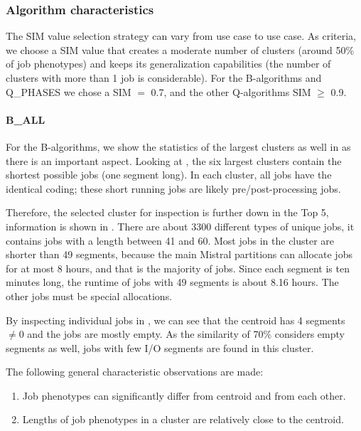 \documentclass{jhps}
\begin{document}
\subsubsection{Algorithm characteristics}
The SIM value selection strategy can vary from use case to use case.
As criteria, we choose a SIM value that creates a moderate number of clusters (around 50\% of job phenotypes) and keeps its generalization capabilities (the number of clusters with more than 1 job is considerable).
For the B-algorithms and Q\_PHASES we chose a SIM $=$ 0.7, and the other Q-algorithms SIM $\geq$ 0.9.

\FloatBarrier
\paragraph{B\_ALL}
For the B-algorithms, we show the statistics of the largest clusters as well in  as there is an important aspect.
Looking at , the six largest clusters contain the shortest possible jobs (one segment long).
In each cluster, all jobs have the identical coding; these short running jobs are likely pre/post-processing jobs.

Therefore, the selected cluster for inspection is further down in the Top 5, information is shown in .
There are about 3300 different types of unique jobs, it contains jobs with a length between 41 and 60.
Most jobs in the cluster are shorter than 49 segments, because the main Mistral partitions can allocate jobs for at most 8 hours, and that is the majority of jobs.
Since each segment is ten minutes long, the runtime of jobs with 49 segments is about 8.16 hours.
The other jobs must be special allocations.

By inspecting individual jobs in , we can see that the centroid has 4 segments $\neq 0$ and the jobs are mostly empty.
As the similarity of 70\% considers empty segments as well, jobs with few I/O segments are found in this cluster.

The following general characteristic observations are made:
\begin{enumerate}
 \item Job phenotypes can significantly differ from centroid and from each other.
 \item Lengths of job phenotypes in a cluster are relatively close to the centroid.
\end{enumerate}
\end{document}
